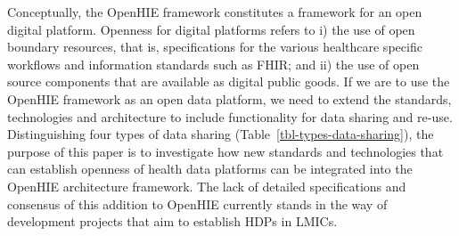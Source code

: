 \documentclass[
  authoryear]{elsarticle}
\begin{document}
Conceptually, the OpenHIE framework constitutes a framework for an open
digital platform. Openness for digital platforms refers to i) the use of
open boundary resources, that is, specifications for the various
healthcare specific workflows and information standards such as FHIR;
and ii) the use of open source components that are available as digital
public goods\citep{digitalpublicgoods}. If we are to use the OpenHIE
framework as an open data platform, we need to extend the standards,
technologies and architecture to include functionality for data sharing
and re-use. Distinguishing four types of data sharing
(Table~\ref{tbl-types-data-sharing}), the purpose of this paper is to
investigate how new standards and technologies that can establish
openness of health data platforms can be integrated into the OpenHIE
architecture framework. The lack of detailed specifications and
consensus of this addition to OpenHIE currently stands in the way of
development projects that aim to establish HDPs in LMICs.
\end{document}
